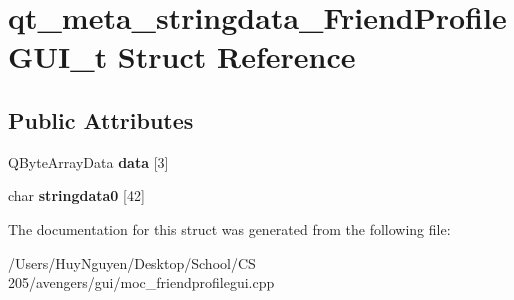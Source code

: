 \hypertarget{structqt__meta__stringdata__FriendProfileGUI__t}{}\section{qt\+\_\+meta\+\_\+stringdata\+\_\+\+Friend\+Profile\+G\+U\+I\+\_\+t Struct Reference}
\label{structqt__meta__stringdata__FriendProfileGUI__t}
\subsection*{Public Attributes}
\begin{DoxyCompactItemize}
\item 
Q\+Byte\+Array\+Data {\bfseries data} \mbox{[}3\mbox{]}\hypertarget{structqt__meta__stringdata__FriendProfileGUI__t_aea384d535882c254c6c8df3ffc65f825}{}\label{structqt__meta__stringdata__FriendProfileGUI__t_aea384d535882c254c6c8df3ffc65f825}

\item 
char {\bfseries stringdata0} \mbox{[}42\mbox{]}\hypertarget{structqt__meta__stringdata__FriendProfileGUI__t_a5ef163a206806b5442eeb013e7592ca0}{}\label{structqt__meta__stringdata__FriendProfileGUI__t_a5ef163a206806b5442eeb013e7592ca0}

\end{DoxyCompactItemize}


The documentation for this struct was generated from the following file\+:\begin{DoxyCompactItemize}
\item 
/\+Users/\+Huy\+Nguyen/\+Desktop/\+School/\+C\+S 205/avengers/gui/moc\+\_\+friendprofilegui.\+cpp\end{DoxyCompactItemize}
